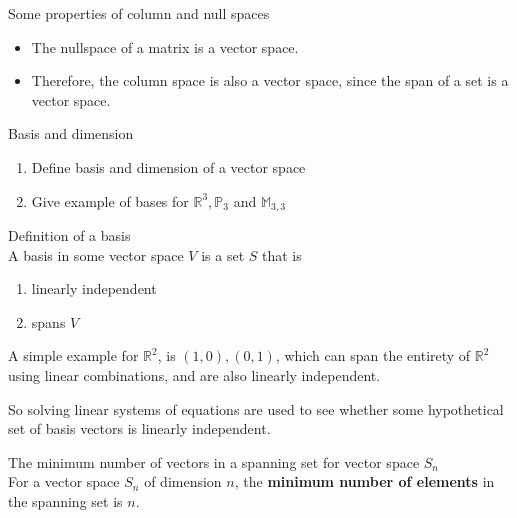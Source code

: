 \documentclass[journal, letterpaper]{IEEEtran}
\begin{document}
    \begin{myboxr}{Some properties of column and null spaces}
        \begin{itemize}
            \item The nullspace of a matrix is a vector space.
            \item Therefore, the column space is also a vector space, since the span of a set is a vector space.
        \end{itemize}
    \end{myboxr}
    \begin{mybox}{Basis and dimension}
        \begin{enumerate}
            \item Define basis and dimension of a vector space
            \item Give example of bases for $\mathbb{R}^3, \mathbb{P}_3$ and $\mathbb{M}_{3, 3}$
        \end{enumerate}
    \end{mybox}
    \begin{myboxr}{Definition of a basis} \\ 
        A basis in some vector space $V$ is a set $S$ that is 
        \begin{enumerate}
            \item linearly independent
            \item spans $V$
        \end{enumerate}
        A simple example for $\mathbb{R}^2$, is $(1, 0), (0, 1)$, which can span the entirety of $\mathbb{R}^2$ using linear combinations, and are also linearly independent.
    \end{myboxr}
    So solving linear systems of equations are used to see whether some hypothetical set of basis vectors is linearly independent.
    \begin{myboxr}{The minimum number of vectors in a spanning set for vector space $S_n$} \\ 
        For a vector space $S_n$ of dimension $n$, the \textbf{minimum number of elements} in the spanning set is $n$.
    \end{myboxr}
\end{document}
